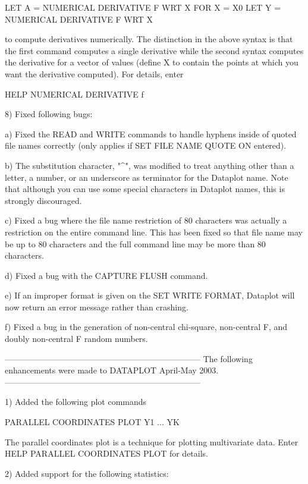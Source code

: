 {       LET A = NUMERICAL DERIVATIVE F WRT X FOR X = X0
       LET Y = NUMERICAL DERIVATIVE F WRT X

    to compute derivatives numerically.  The distinction in the
    above syntax is that the first command computes a single
    derivative while the second syntax computes the derivative
    for a vector of values (define X to contain the points at
    which you want the derivative computed).  For details, enter

        HELP NUMERICAL DERIVATIVE f

 8) Fixed following bugs:

    a) Fixed the READ and WRITE commands to handle hyphens inside
       of quoted file names correctly (only applies if
       SET FILE NAME QUOTE ON entered).

    b) The substitution character, "^", was modified to treat
       anything other than a letter, a number, or an underscore
       as terminator for the Dataplot name.  Note that although you
       can use some special characters in Dataplot names, this
       is strongly discouraged.

    c) Fixed a bug where the file name restriction of 80 characters
       was actually a restriction on the entire command line.  This
       has been fixed so that file name may be up to 80 characters
       and the full command line may be more than 80 characters.

    d) Fixed a bug with the CAPTURE FLUSH command.

    e) If an improper format is given on the SET WRITE FORMAT,
       Dataplot will now return an error message rather than
       crashing.

    f) Fixed a bug in the generation of non-central chi-square,
       non-central F, and doubly non-central F random numbers.

-----------------------------------------------------------------------
The following enhancements were made to DATAPLOT April-May        2003.
-----------------------------------------------------------------------

 1) Added the following plot commands

       PARALLEL COORDINATES PLOT Y1 ... YK

    The parallel coordinates plot is a technique for plotting
    multivariate data.  Enter HELP PARALLEL COORDINATES PLOT
    for details.

 2) Added support for the following statistics:

}
